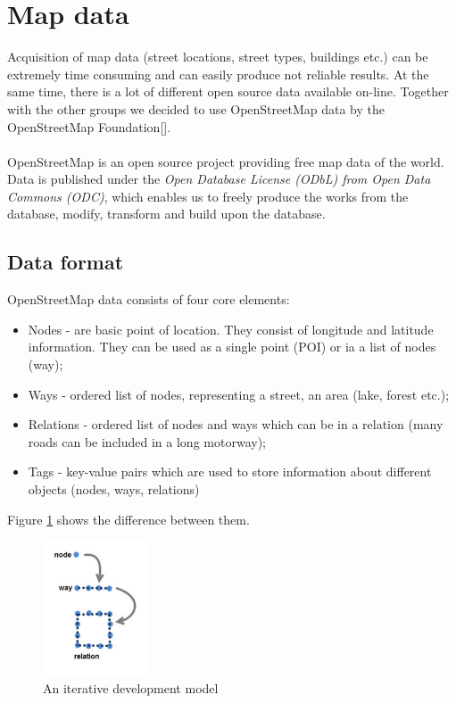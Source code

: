 \documentclass[reqno,openany,12pt]{amsbook}
\theoremstyle{definition}
\theoremstyle{remark}
\begin{document}
\section{Map data}
Acquisition of map data (street locations, street types, buildings etc.) can be extremely time consuming and can easily produce not reliable results. At the same time, there is a lot of different open source data available on-line. Together with the other groups we decided to use OpenStreetMap data by the OpenStreetMap Foundation[].\\
\\
OpenStreetMap is an open source project providing free map data of the world. Data is published under the \textit{Open Database License (ODbL) from Open Data Commons (ODC)}, which enables us to freely produce the works from the database, modify, transform and build upon the database.
\subsection{Data format}
OpenStreetMap data consists of four core elements:
\begin{itemize}
\item Nodes - are basic point of location. They consist of longitude and latitude information. They can be used as a single point (POI) or ia a list of nodes (way);
\item Ways - ordered list of nodes, representing a street, an area (lake, forest etc.);
\item Relations - ordered list of nodes and ways which can be in a relation (many roads can be included in a long motorway);
\item Tags - key-value pairs which are used to store information about different objects (nodes, ways, relations)
\end{itemize}
Figure \ref{fig:Osm_flow} shows the difference between them.
\begin{figure}[h]
\centering
\includegraphics[height=4cm]{../photos/OSM_flow.jpg}
\caption{An iterative development model}
\label{fig:Osm_flow}
\end{figure}
\end{document}
